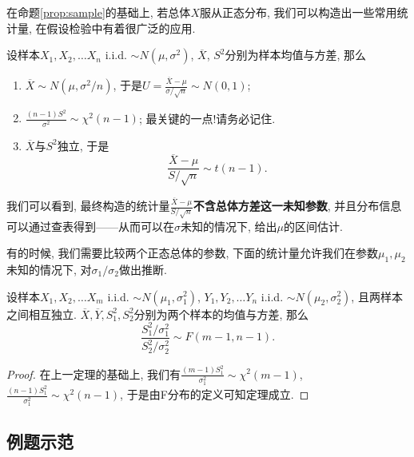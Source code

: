 \documentclass[11pt]{ctexart}
\begin{document}

在命题\ref{prop:sample}的基础上, 若总体$X$服从正态分布, 我们可以构造出一些常用统计量, 在假设检验中有着很广泛的应用. 


\begin{theorem}[单正态总体的抽样分布]
	设样本$X_1, X_2, \dots X_n$ i.i.d. $\sim N(\mu, \sigma^2)$, $\overline{X}$, $S^2$分别为样本均值与方差, 那么
	\begin{enumerate}
		\item $\overline{X} \sim N(\mu, \sigma^2 / n)$, 于是$U = \frac{\overline X - \mu}{\sigma / \sqrt{n}} \sim N(0,1)$; 
		\item $\frac{(n-1) S^2}{\sigma^2} \sim \chi^2(n-1)$; {\color{cyan} 最关键的一点!请务必记住.}
		\item $\overline{X}$与$S^2$独立, 于是
			\begin{equation*}
				\frac{\overline{X} - \mu}{S / \sqrt{n}} \sim t(n-1). 
			\end{equation*}
	\end{enumerate}	
\end{theorem}
我们可以看到, 最终构造的统计量$\frac{\overline{X} - \mu}{S / \sqrt{n}}$\textbf{不含总体方差这一未知参数}, 并且分布信息可以通过查表得到——从而可以在$\sigma$未知的情况下, 给出$\mu$的区间估计. 

有的时候, 我们需要比较两个正态总体的参数, 下面的统计量允许我们在参数$\mu_1, \mu_2$未知的情况下, 对$\sigma_1 / \sigma_2$做出推断. 
\begin{theorem}[双正态总体的抽样分布]
	设样本$X_1, X_2, \dots X_m$ i.i.d. $\sim N(\mu_1, \sigma_1^2)$, $Y_1, Y_2, \dots Y_n$ i.i.d. $\sim N(\mu_2, \sigma_2^2)$, 且两样本之间相互独立.  
	$\overline X, \overline Y, S_1^2, S_2^2$分别为两个样本的均值与方差, 那么
	\begin{equation*}
		\frac{S_1^2 / \sigma_1^2}{S_2^2 / \sigma_2^2} \sim F(m-1, n-1). 
	\end{equation*}
\end{theorem}
\begin{proof}
	在上一定理的基础上, 我们有$\frac{(m-1) S_1^2}{\sigma_1^2} \sim \chi^2(m-1)$, $\frac{(n-1) S_1^2}{\sigma_1^2} \sim \chi^2(n-1)$, 于是由F分布的定义可知定理成立. 
\end{proof}

\subsection{例题示范}
\end{document}
